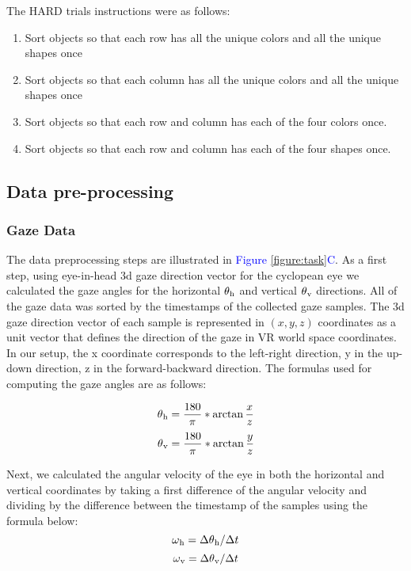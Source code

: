 The HARD trials instructions were as follows:
\begin{enumerate}
    \item Sort objects so that each row has all the unique colors and all the unique shapes once
    \item Sort objects so that each column has all the unique colors and all the unique  shapes once
    \item Sort objects so that each row and column has each of the four colors once. 
    \item Sort objects so that each row and column has each of the four shapes once. 
\end{enumerate}


\subsection{Data pre-processing}

\subsubsection{Gaze Data}

The data preprocessing steps are illustrated in \textcolor{Blue}{Figure \ref{figure:task}C}. As a first step, using eye-in-head 3d gaze direction vector for the cyclopean eye we calculated the gaze angles for the horizontal $\theta\textsubscript{h}$ and vertical $\theta\textsubscript{v}$ directions. All of the gaze data was sorted by the timestamps of the collected gaze samples. The 3d gaze direction vector of each sample is represented in $(x, y, z)$ coordinates as a unit vector that defines the direction of the gaze in VR world space coordinates. In our setup, the x coordinate corresponds to the left-right direction, y in the up-down direction, z in the forward-backward direction. The formulas used for computing the gaze angles are as follows:

 \begin{equation*}\label{eq:h_angle}
     \theta\textsubscript{h} = \frac{180}{\pi} * \arctan{\frac{x}{z}}
 \end{equation*}   
  \begin{equation*}\label{eq:v_angle}
     \theta\textsubscript{v} = \frac{180}{\pi} * \arctan{\frac{y}{z}} 
 \end{equation*}   
 
Next, we calculated the angular velocity of the eye in both the horizontal and vertical coordinates by taking a first difference of the angular velocity and dividing by the difference between the timestamp of the samples using the formula below:
\begin{equation*}\label{eq:h_vel_angle}
    \omega\textsubscript{h} = \Delta\theta\textsubscript{h} / \Delta t
 \end{equation*}  
 \begin{equation*}\label{eq:v_vel_angle}
     \omega\textsubscript{v} = \Delta\theta\textsubscript{v} / \Delta t
 \end{equation*}  

